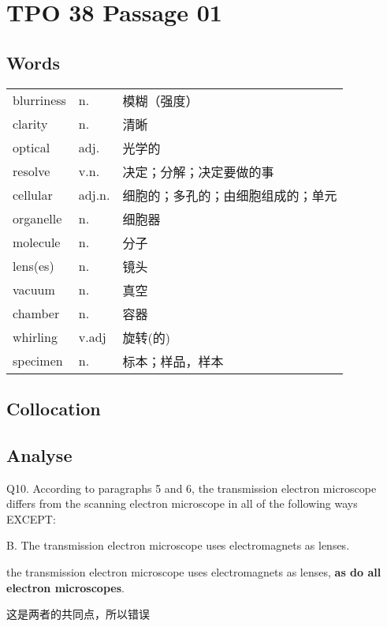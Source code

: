 \section{TPO 38 Passage 01}

\subsection{Words}

\begin{tabular}{lll}
    blurriness & n.     & 模糊（强度）            \\
    clarity    & n.     & 清晰                \\
    optical    & adj.   & 光学的               \\
    resolve    & v.n.   & 决定；分解；决定要做的事      \\
    cellular   & adj.n. & 细胞的；多孔的；由细胞组成的；单元 \\
    organelle  & n.     & 细胞器               \\
    molecule   & n.     & 分子                \\
    lens(es)   & n.     & 镜头                \\
    vacuum     & n.     & 真空                \\
    chamber    & n.     & 容器                \\
    whirling   & v.adj  & 旋转(的)             \\
    specimen   & n.     & 标本；样品，样本          \\
\end{tabular}

\subsection{Collocation}

\newpage

\subsection{Analyse}

\begin{blk}
    \begin{qst}
        Q10. According to paragraphs 5 and 6, the transmission electron microscope differs from the scanning electron microscope in all of the following ways EXCEPT:
    \end{qst}

    \begin{chc}
        B. The transmission electron microscope uses electromagnets as lenses.
    \end{chc}

    \begin{psgq}
        the transmission electron microscope uses electromagnets as lenses, \textbf{as do all electron microscopes}.
    \end{psgq}

    \begin{nlz}
        这是两者的共同点，所以错误
    \end{nlz}
\end{blk}

\newpage

